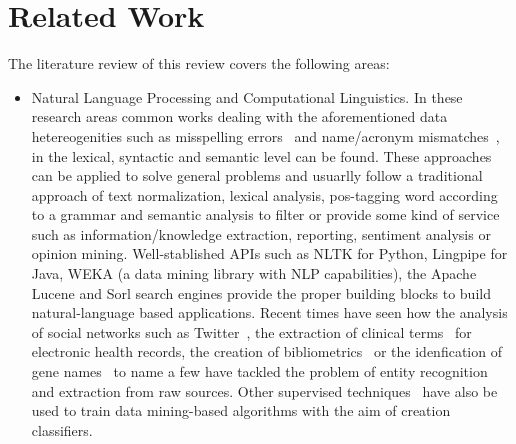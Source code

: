 \documentclass{llncs}
\begin{document}
\section{Related Work}
The literature review of this review covers the following areas:
\begin{itemize}
 \item Natural Language Processing and Computational Linguistics. In these research areas common works dealing with the aforementioned data hetereogenities 
   such as misspelling errors~\cite{NorvigSpelling,StanfordSpelling} and name/acronym mismatches~\cite{Yeates99automaticextraction,Ratinov:2004:AES:1025132.1026366}, 
  in the lexical, syntactic and semantic level can be found. These approaches can be applied to solve general problems and usuarlly follow a 
  traditional approach of text normalization, lexical analysis, pos-tagging word according to a grammar and semantic analysis to filter or 
  provide some kind of service such as information/knowledge extraction, reporting, sentiment analysis or opinion mining. 
  Well-stablished APIs such as NLTK for Python, Lingpipe for Java, WEKA (a data mining library with NLP capabilities), the Apache Lucene and Sorl 
  search engines  provide the proper building blocks to build natural-language based applications. Recent times have seen how the analysis 
  of social networks such as Twitter~\cite{Li:2012:TNE:2348283.2348380,Gimpel:2011:PTT:2002736.2002747}, the extraction of 
  clinical terms~\cite{Wang:2009:ARN:1667884.1667888} for electronic health records, the creation of bibliometrics~\cite{Galvez2006,Morillo:2013:TAA:2424697.2424727} or 
  the idenfication of gene names~\cite{Krauthammer:2004:TIB:1053007.1053018,Galvez2012} to name a few have tackled the problem of entity recognition and extraction from raw sources. 
  Other supervised techniques~\cite{Bohn:2006:PHD} have also be used to train data mining-based algorithms with the aim of creation 
  classifiers.
 

\end{itemize}
\end{document}
